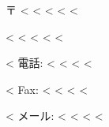 〒 <%
<%
<%
<%
<%

\vspace{.5cm}
<%
<%
<%
<%
\hspace{0.1cm} 
<%

<%
電話: <%
<%
<%
\hspace{0.1cm}
<%

<%
Fax: <%
<%
<%
\hspace{0.1cm}
<%

<%
メール: <%
<%
<%
\hspace{0.1}
<%